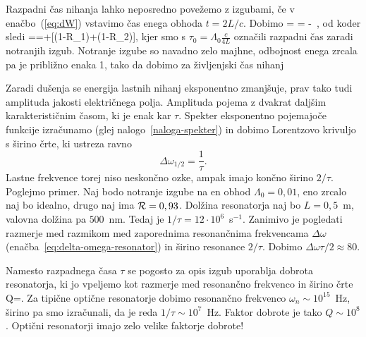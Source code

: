 Razpadni čas nihanja lahko neposredno povežemo z izgubami, če v enačbo~(\ref{eq:dW})
vstavimo čas enega obhoda $t=2L/c$. Dobimo
\beq
{}= \Lambda = -\, ,
\eeq
od koder sledi
\beq
{}==+[(1-{\cal R}_{1})+(1-{\cal R}_{2})],
\label{taulambda}
\eeq
kjer smo s $\tau_{0}=\Lambda_{0}\frac{c}{4L}$ označili razpadni
čas zaradi notranjih izgub. Notranje izgube so navadno zelo majhne, odbojnost enega zrcala
pa je približno enaka 1, tako da dobimo za življenjski čas nihanj 

Zaradi dušenja se energija lastnih nihanj eksponentno zmanjšuje, prav tako tudi
amplituda jakosti električnega polja. Amplituda pojema z dvakrat daljšim 
karakterističnim časom, ki je enak kar $\tau$. Spekter eksponentno pojemajoče funkcije izračunamo
(glej nalogo~\ref{naloga-spekter}) in dobimo Lorentzovo krivuljo s širino črte, ki ustreza ravno
\begin{equation}
\Delta\omega_{1/2}=\frac{1}{\tau}.
\label{3.26}
\end{equation}
Lastne frekvence torej niso neskončno ozke, ampak imajo končno širino $2/\tau$.
Poglejmo primer. Naj bodo notranje izgube na en obhod $\Lambda_0=0,01$,
eno zrcalo naj bo idealno, drugo naj ima ${\cal R}=0,93$. Dolžina
resonatorja naj bo $L=0,5$~m, valovna dolžina pa $500$~nm. Tedaj
je $1/\tau=12\cdot10^{6}$~s$^{-1}$. Zanimivo je pogledati razmerje med 
razmikom med zaporednima resonančnima frekvencama $\Delta \omega$ 
(enačba~\ref{eq:delta-omega-resonator}) in širino resonance $2/\tau$. 
Dobimo $\Delta\omega\tau/2 \approx 80$.\\

\begin{remark}
Namesto razpadnega časa $\tau$ se pogosto za opis izgub uporablja
dobrota resonatorja, ki jo vpeljemo kot
razmerje med resonančno frekvenco in širino črte 
\beq
Q=.
\eeq
Za tipične optične resonatorje dobimo resonančno 
frekvenco $\omega_n \sim 10^{15}$~Hz, širino pa smo izračunali, da je reda 
 $1/\tau \sim 10^{7}$~Hz. Faktor dobrote je tako $Q \sim 10^{8}$. Optični 
 resonatorji imajo zelo velike faktorje dobrote!
\end{remark}

